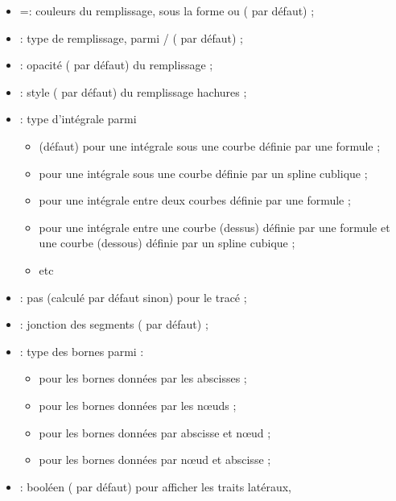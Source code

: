 \documentclass[11pt,a4paper]{ltxdoc}
\begin{document}
\begin{itemize}
  \item {} =: couleurs du remplissage, sous la forme  ou  ( par défaut) ;
  \item {} : type de remplissage, parmi / ( par défaut) ;
  \item {} : opacité ( par défaut) du remplissage ;
  \item {} : style ( par défaut) du remplissage hachures ;
  \item {} : type d'intégrale parmi
  \begin{itemize}
    \item {} (défaut) pour une intégrale sous une courbe définie par une formule ;
    \item {} pour une intégrale sous une courbe définie par un spline cublique ;
    \item {} pour une intégrale entre deux courbes définie par une formule ;
    \item {} pour une intégrale entre une courbe (dessus) définie par une formule et une courbe (dessous) définie par un spline cubique ;
    \item etc
  \end{itemize}
  \item {} : pas (calculé par défaut sinon) pour le tracé ;
  \item {} : jonction des segments ( par défaut) ;
  \item {} : type des bornes parmi :
  \begin{itemize}
    \item {} pour les bornes données par les abscisses ;
    \item {} pour les bornes données par les nœuds ;
    \item {} pour les bornes données par abscisse et nœud ;
    \item {} pour les bornes données par nœud et abscisse ;
  \end{itemize}
  \item {} : booléen ( par défaut) pour afficher les traits latéraux,%

\end{itemize}
\end{document}
